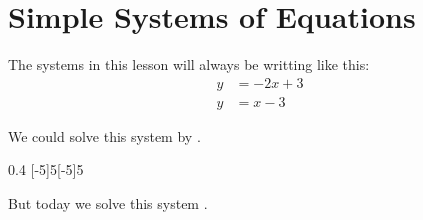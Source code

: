 \section{Simple Systems of Equations}

The systems in this lesson will always be writting like this:
\begin{align*}
    y &= -2x + 3 \\
    y &= x-3
\end{align*}

We could solve this system by .

\begin{center}
    \begin{myTikzpictureGrid}{0.4} [-5]{5}[-5]{5}
        \end{myTikzpictureGrid}
\end{center}
%
But today we solve this system 
.